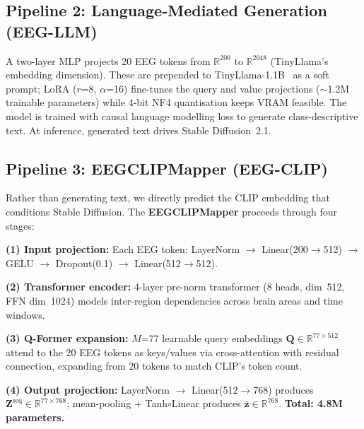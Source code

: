 \documentclass{article}
\begin{document}
\subsection{Pipeline 2: Language-Mediated Generation (EEG-LLM)}

A two-layer MLP projects 20 EEG tokens from $\mathbb{R}^{200}$ to $\mathbb{R}^{2048}$ (TinyLlama's embedding dimension). These are prepended to TinyLlama-1.1B~\citep{zhang2024tinyllama} as a soft prompt; LoRA ($r$=8, $\alpha$=16) fine-tunes the query and value projections ($\sim$1.2M trainable parameters) while 4-bit NF4 quantisation keeps VRAM feasible. The model is trained with causal language modelling loss to generate class-descriptive text. At inference, generated text drives Stable Diffusion~2.1.

\subsection{Pipeline 3: EEGCLIPMapper (EEG-CLIP)}
\label{sec:p3}

Rather than generating text, we directly predict the CLIP embedding that conditions Stable Diffusion. The \textbf{EEGCLIPMapper} proceeds through four stages:

\textbf{(1) Input projection:} Each EEG token: LayerNorm $\to$ Linear(200$\to$512) $\to$ GELU $\to$ Dropout(0.1) $\to$ Linear(512$\to$512).

\textbf{(2) Transformer encoder:} 4-layer pre-norm transformer (8 heads, dim~512, FFN dim~1024) models inter-region dependencies across brain areas and time windows.

\textbf{(3) Q-Former expansion:} $M$=77 learnable query embeddings $\mathbf{Q}\in\mathbb{R}^{77\times512}$ attend to the 20 EEG tokens as keys/values via cross-attention with residual connection, expanding from 20 tokens to match CLIP's token count.

\textbf{(4) Output projection:} LayerNorm $\to$ Linear(512$\to$768) produces $\mathbf{Z}^{\text{seq}}\in\mathbb{R}^{77\times768}$; mean-pooling $+$ Tanh$\circ$Linear produces $\bar{\mathbf{z}}\in\mathbb{R}^{768}$. \textbf{Total: 4.8M parameters.}
\end{document}
